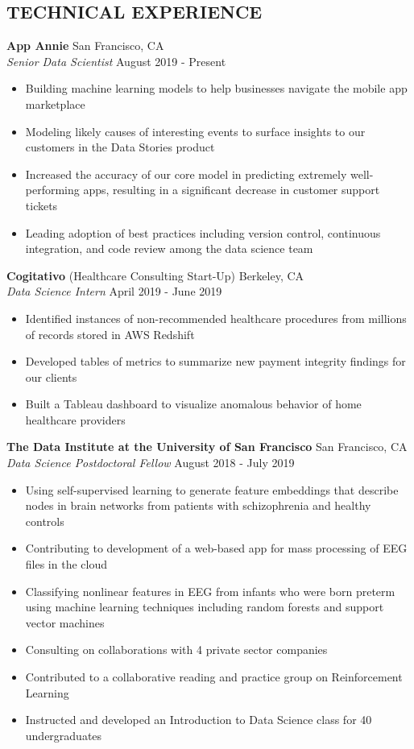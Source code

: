 \documentclass[line,margin,10pt]{res}
\begin{document}
\begin{resume}
\section{TECHNICAL EXPERIENCE}

\textbf{App Annie} \hfill San Francisco, CA \\
{\sl Senior Data Scientist} \hfill August 2019 - Present
\begin{itemize} \itemsep -2pt
\item Building machine learning models to help businesses navigate the mobile app marketplace
\item Modeling likely causes of interesting events to surface insights to our customers in the Data Stories product
\item Increased the accuracy of our core model in predicting extremely well-performing apps, resulting in a significant decrease in customer support tickets
\item Leading adoption of best practices including version control, continuous integration, and code review among the data science team
\end{itemize}

\textbf{Cogitativo} (Healthcare Consulting Start-Up) \hfill Berkeley, CA \\
{\sl Data Science Intern} \hfill April 2019 - June 2019
\begin{itemize} \itemsep -2pt
\item Identified instances of non-recommended healthcare procedures from millions of records stored in AWS Redshift
\item Developed tables of metrics to summarize new payment integrity findings for our clients
\item Built a Tableau dashboard to visualize anomalous behavior of home healthcare providers
\end{itemize}

\textbf{The Data Institute at the University of San Francisco} \hfill San Francisco, CA \\
{\sl Data Science Postdoctoral Fellow} \hfill August 2018 - July 2019
\begin{itemize} \itemsep -2pt
\item Using self-supervised learning to generate feature embeddings that describe nodes in brain networks from patients with schizophrenia and healthy controls
\item Contributing to development of a web-based app for mass processing of EEG files in the cloud
\item Classifying nonlinear features in EEG from infants who were born preterm using machine learning techniques including random forests and support vector machines
\item Consulting on collaborations with 4 private sector companies
\item Contributed to a collaborative reading and practice group on Reinforcement Learning
\item Instructed and developed an Introduction to Data Science class for 40 undergraduates
\end{itemize}



\end{resume}
\end{document}
